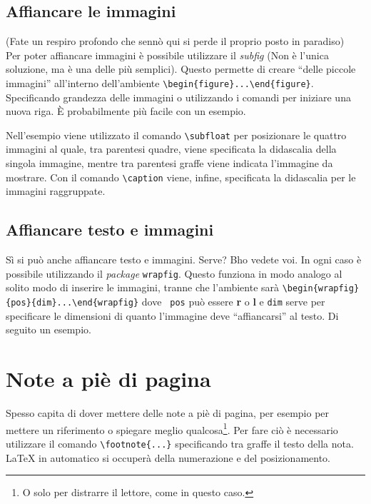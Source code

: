 \subsection{Affiancare le immagini}
(Fate un respiro profondo che sennò qui si perde il proprio posto in paradiso) 
\\
Per poter affiancare immagini è possibile utilizzare il \textit{subfig} (Non è 
l'unica soluzione, ma è una delle più semplici). Questo permette di creare 
``delle piccole immagini'' all'interno dell'ambiente 
\verb!\begin{figure}...\end{figure}!. Specificando grandezza delle immagini o 
utilizzando i comandi per iniziare una nuova riga. È probabilmente più facile 
con un esempio.

Nell'esempio viene utilizzato il comando \verb!\subfloat! per posizionare le 
quattro immagini al quale, tra parentesi quadre, viene specificata la 
didascalia della singola immagine, mentre tra parentesi graffe viene indicata 
l'immagine da mostrare. Con il comando \verb!\caption! viene, infine, 
specificata la didascalia per le immagini raggruppate.

\subsection{Affiancare testo e immagini}
Sì si può anche affiancare testo e immagini. Serve? Bho vedete voi. In ogni 
caso è possibile utilizzando il \textit{package} \verb!wrapfig!. Questo 
funziona in modo analogo al solito modo di inserire le immagini, tranne che 
l'ambiente sarà \verb!\begin{wrapfig}{pos}{dim}...\end{wrapfig}! dove \texttt{
pos} può essere \textbf{r} o \textbf{l} e \texttt{dim} serve per specificare 
le dimensioni di quanto l'immagine deve ``affiancarsi'' al testo. Di seguito 
un esempio. 



\section{Note a piè di pagina}
Spesso capita di dover mettere delle note a piè di pagina, per esempio per 
mettere un riferimento o spiegare meglio qualcosa\footnote{O solo per 
distrarre il lettore, come in questo caso.}. Per fare ciò è necessario 
utilizzare il comando \verb!\footnote{...}! specificando tra graffe il testo 
della nota. \LaTeX{} in automatico si occuperà della numerazione e del 
posizionamento.


